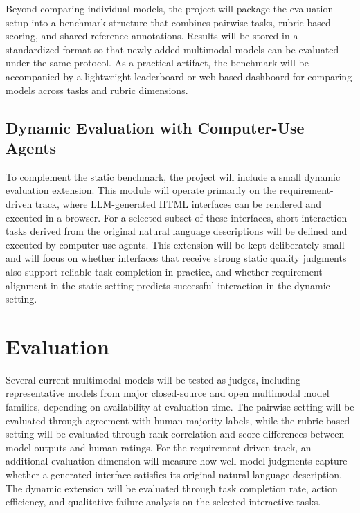 \documentclass[pdflatex,sn-mathphys-num]{sn-jnl}
\begin{document}
Beyond comparing individual models, the project will package the evaluation setup into
a benchmark structure that combines pairwise tasks, rubric-based scoring, and shared
reference annotations. Results will be stored in a standardized format so that newly
added multimodal models can be evaluated under the same protocol. As a practical
artifact, the benchmark will be accompanied by a lightweight leaderboard or web-based
dashboard for comparing models across tasks and rubric dimensions.

\subsection{Dynamic Evaluation with Computer-Use Agents}

To complement the static benchmark, the project will include a small dynamic evaluation
extension. This module will operate primarily on the requirement-driven track, where
LLM-generated HTML interfaces can be rendered and executed in a browser. For a selected
subset of these interfaces, short interaction tasks derived from the original natural
language descriptions will be defined and executed by computer-use agents. This
extension will be kept deliberately small and will focus on whether interfaces that
receive strong static quality judgments also support reliable task completion in
practice, and whether requirement alignment in the static setting predicts successful
interaction in the dynamic setting.

\section{Evaluation}\label{sec:evaluation}

Several current multimodal models will be tested as judges, including representative
models from major closed-source and open multimodal model families, depending on
availability at evaluation time. The pairwise setting will be evaluated through
agreement with human majority labels, while the rubric-based setting will be evaluated
through rank correlation and score differences between model outputs and human ratings.
For the requirement-driven track, an additional evaluation dimension will measure how
well model judgments capture whether a generated interface satisfies its original
natural language description. The dynamic extension will be evaluated through task
completion rate, action efficiency, and qualitative failure analysis on the selected
interactive tasks.
\end{document}
